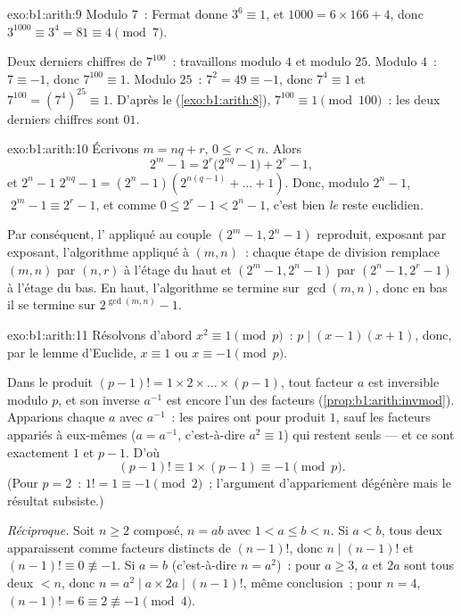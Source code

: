 \begin{solution}{exo:b1:arith:9}
Modulo $7$~: Fermat donne $3^6 \equiv 1$, et $1000 = 6 \times 166 + 4$,
donc $3^{1000} \equiv 3^4 = 81 \equiv 4 \pmod 7$.

Deux derniers chiffres de $7^{100}$~: travaillons modulo $4$ et modulo $25$. Modulo $4$~: $7
\equiv -1$, donc $7^{100} \equiv 1$. Modulo $25$~: $7^2 = 49 \equiv -1$, donc
$7^4 \equiv 1$ et $7^{100} = (7^4)^{25} \equiv 1$. D'après le  (\cref{exo:b1:arith:8}), $7^{100} \equiv 1
\pmod{100}$~: les deux derniers chiffres sont $01$.
\end{solution}

\begin{solution}{exo:b1:arith:10}
Écrivons $m = nq + r$, $0 \leq r < n$. Alors
\[
2^m - 1 = 2^r\bigl(2^{nq} - 1\bigr) + 2^r - 1,
\]
et $2^n - 1$  $2^{nq} - 1 = (2^n - 1)(2^{n(q-1)} + \dots +
1)$. Donc, modulo $2^n - 1$, $\;2^m - 1 \equiv 2^r - 1$, et comme $0 \leq
2^r - 1 < 2^n - 1$, c'est bien \emph{le} reste euclidien.

Par conséquent, l' appliqué au couple $(2^m - 1, 2^n - 1)$
reproduit, exposant par exposant, l'algorithme appliqué à $(m, n)$~: chaque
étape de division remplace $(m, n)$ par $(n, r)$ à l'étage du haut et $(2^m - 1,
2^n - 1)$ par $(2^n - 1, 2^r - 1)$ à l'étage du bas. En haut, l'algorithme
se termine sur $\gcd(m,n)$, donc en bas il se termine sur
$2^{\gcd(m,n)} - 1$.
\end{solution}

\begin{solution}{exo:b1:arith:11}
Résolvons d'abord $x^2 \equiv 1 \pmod p$~: $p \mid (x-1)(x+1)$, donc, par
le lemme d'Euclide, $x \equiv 1$ ou $x \equiv -1 \pmod p$.

Dans le produit $(p-1)! = 1 \times 2 \times \dots \times (p-1)$, tout
facteur $a$ est inversible modulo $p$, et son inverse $a^{-1}$ est encore
l'un des facteurs (\cref{prop:b1:arith:invmod}). Apparions chaque $a$ avec
$a^{-1}$~: les paires ont pour produit $1$, sauf les facteurs appariés à
eux-mêmes ($a = a^{-1}$, c'est-à-dire $a^2 \equiv 1$) qui restent seuls --- et ce sont
exactement $1$ et $p - 1$. D'où
\[
(p-1)! \equiv 1 \times (p - 1) \equiv -1 \pmod p .
\]
(Pour $p = 2$~: $1! = 1 \equiv -1 \pmod 2$~; l'argument d'appariement
dégénère mais le résultat subsiste.)

\emph{Réciproque.} Soit $n \geq 2$ composé, $n = ab$ avec $1 < a
\leq b < n$. Si $a < b$, tous deux apparaissent comme facteurs distincts de $(n-1)!$,
donc $n \mid (n-1)!$ et $(n-1)! \equiv 0 \not\equiv -1$. Si $a = b$
(c'est-à-dire $n = a^2$)~: pour $a \geq 3$, $a$ et $2a$ sont tous deux $< n$, donc
$n = a^2 \mid a \times 2a \mid (n-1)!$, même conclusion~; pour $n = 4$,
$(n-1)! = 6 \equiv 2 \not\equiv -1 \pmod 4$.
\end{solution}

